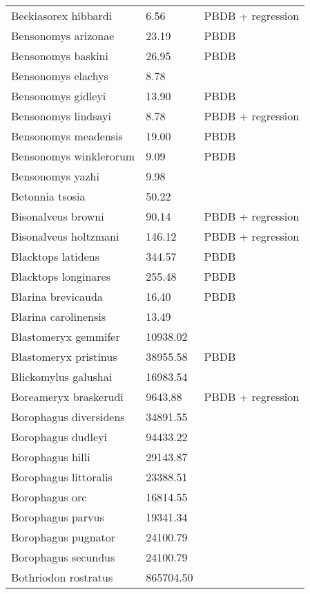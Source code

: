 \begin{center}
\begin{longtable}{p{} p{} p{} }
  Beckiasorex hibbardi & 6.56 & PBDB + regression \\ 
  Bensonomys arizonae & 23.19 & PBDB \\ 
  Bensonomys baskini & 26.95 & PBDB \\ 
  Bensonomys elachys & 8.78 & \cite{Kirk2011} \\ 
  Bensonomys gidleyi & 13.90 & PBDB \\ 
  Bensonomys lindsayi & 8.78 & PBDB + regression \\ 
  Bensonomys meadensis & 19.00 & PBDB \\ 
  Bensonomys winklerorum & 9.09 & PBDB \\ 
  Bensonomys yazhi & 9.98 & \cite{Rose2013a} \\ 
  Betonnia tsosia & 50.22 & \cite{Clemens2005} \\ 
  Bisonalveus browni & 90.14 & PBDB + regression \\ 
  Bisonalveus holtzmani & 146.12 & PBDB + regression \\ 
  Blacktops latidens & 344.57 & PBDB \\ 
  Blacktops longinares & 255.48 & PBDB \\ 
  Blarina brevicauda & 16.40 & PBDB \\ 
  Blarina carolinensis & 13.49 & \cite{Smith2004} \\ 
  Blastomeryx gemmifer & 10938.02 & \cite{Tomiya2013} \\ 
  Blastomeryx pristinus & 38955.58 & PBDB \\ 
  Blickomylus galushai & 16983.54 & \cite{Tomiya2013} \\ 
  Boreameryx braskerudi & 9643.88 & PBDB + regression \\ 
  Borophagus diversidens & 34891.55 & \cite{Tomiya2013} \\ 
  Borophagus dudleyi & 94433.22 & \cite{Dalquest1978} \\ 
  Borophagus hilli & 29143.87 & \cite{Tomiya2013} \\ 
  Borophagus littoralis & 23388.51 & \cite{Tomiya2013} \\ 
  Borophagus orc & 16814.55 & \cite{Tomiya2013} \\ 
  Borophagus parvus & 19341.34 & \cite{Tomiya2013} \\ 
  Borophagus pugnator & 24100.79 & \cite{Tomiya2013} \\ 
  Borophagus secundus & 24100.79 & \cite{Tomiya2013} \\ 
  Bothriodon rostratus & 865704.50 & \cite{Cassiliano2008} \\ 

\end{longtable}
\end{center}
